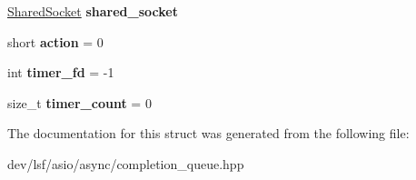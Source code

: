 \begin{DoxyCompactItemize}
\item 
\hypertarget{structlsf_1_1asio_1_1async_1_1CompletionQueue_1_1ReadCompletionFunc_ae1b4780b3e6a783ccd833127d9208970}{
\hyperlink{classlsf_1_1asio_1_1SharedSocket}{SharedSocket} {\bfseries shared\_\-socket}}
\label{structlsf_1_1asio_1_1async_1_1CompletionQueue_1_1ReadCompletionFunc_ae1b4780b3e6a783ccd833127d9208970}

\item 
\hypertarget{structlsf_1_1asio_1_1async_1_1CompletionQueue_1_1ReadCompletionFunc_a044c44a4c311f0b2244cac866dd0cefc}{
short {\bfseries action} = 0}
\label{structlsf_1_1asio_1_1async_1_1CompletionQueue_1_1ReadCompletionFunc_a044c44a4c311f0b2244cac866dd0cefc}

\item 
\hypertarget{structlsf_1_1asio_1_1async_1_1CompletionQueue_1_1ReadCompletionFunc_a2c7a7e67e39b89f8f134a3e86fe937bb}{
int {\bfseries timer\_\-fd} = -\/1}
\label{structlsf_1_1asio_1_1async_1_1CompletionQueue_1_1ReadCompletionFunc_a2c7a7e67e39b89f8f134a3e86fe937bb}

\item 
\hypertarget{structlsf_1_1asio_1_1async_1_1CompletionQueue_1_1ReadCompletionFunc_a62a158dd597054b0642c59f79a387113}{
size\_\-t {\bfseries timer\_\-count} = 0}
\label{structlsf_1_1asio_1_1async_1_1CompletionQueue_1_1ReadCompletionFunc_a62a158dd597054b0642c59f79a387113}

\end{DoxyCompactItemize}


The documentation for this struct was generated from the following file:\begin{DoxyCompactItemize}
\item 
dev/lsf/asio/async/completion\_\-queue.hpp\end{DoxyCompactItemize}
